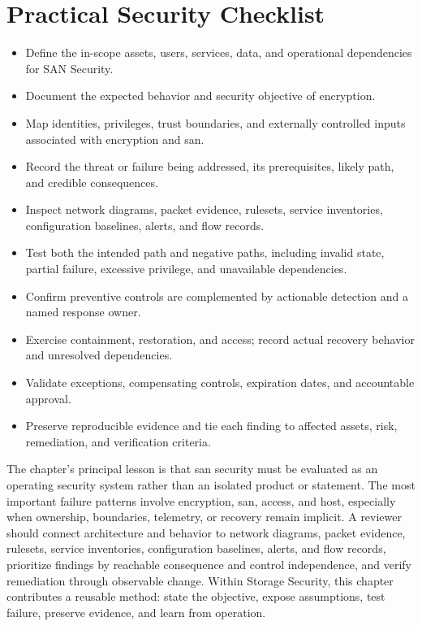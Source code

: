 \documentclass[11pt]{article}
\begin{document}
\section*{Practical Security Checklist}
\begin{itemize}[label=$\square$]
\item Define the in-scope assets, users, services, data, and operational dependencies for SAN Security.
\item Document the expected behavior and security objective of encryption.
\item Map identities, privileges, trust boundaries, and externally controlled inputs associated with encryption and san.
\item Record the threat or failure being addressed, its prerequisites, likely path, and credible consequences.
\item Inspect network diagrams, packet evidence, rulesets, service inventories, configuration baselines, alerts, and flow records.
\item Test both the intended path and negative paths, including invalid state, partial failure, excessive privilege, and unavailable dependencies.
\item Confirm preventive controls are complemented by actionable detection and a named response owner.
\item Exercise containment, restoration, and access; record actual recovery behavior and unresolved dependencies.
\item Validate exceptions, compensating controls, expiration dates, and accountable approval.
\item Preserve reproducible evidence and tie each finding to affected assets, risk, remediation, and verification criteria.
\end{itemize}
\begin{synthesisbox}
The chapter's principal lesson is that san security must be evaluated as an operating security system rather than an isolated product or statement. The most important failure patterns involve encryption, san, access, and host, especially when ownership, boundaries, telemetry, or recovery remain implicit. A reviewer should connect architecture and behavior to network diagrams, packet evidence, rulesets, service inventories, configuration baselines, alerts, and flow records, prioritize findings by reachable consequence and control independence, and verify remediation through observable change. Within Storage Security, this chapter contributes a reusable method: state the objective, expose assumptions, test failure, preserve evidence, and learn from operation.
\end{synthesisbox}
\end{document}
